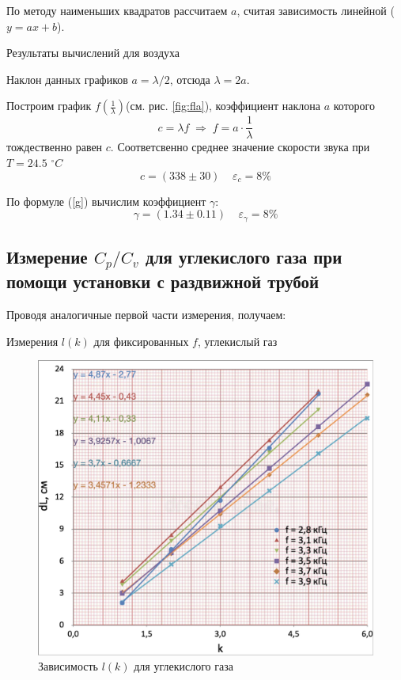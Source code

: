 \documentclass[12pt,a4paper]{article}
\begin{document}
По методу наименьших квадратов рассчитаем $a$, считая зависимость линейной ($y = ax + b$).

\begin{table}[h]
	\caption{Результаты вычислений для воздуха}
	
\end{table}

Наклон данных графиков $a = \lambda/2$, отсюда $\lambda = 2a$.


Построим график $f(\frac{1}{\lambda})$(см. рис. \ref{fig:fla}), коэффициент наклона $a$ которого 
	$$c = \lambda f \; \Rightarrow \; f=a\cdot\frac{1}{\lambda}$$
тождественно равен $c$.
Соответсвенно среднее значение скорости звука при $T = 24.5$ $^{\circ} C$
    $$c=(338 \pm 30) \;\;\;\; \varepsilon_{c}=8\%$$

По формуле (\ref{g}) вычислим коэффициент $\gamma$:
	$$\gamma=(1.34 \pm 0.11) \;\;\;\; \varepsilon_{\gamma}=8\%$$
	
\subsection*{Измерение $ C_p/C_v $ для углекислого газа при помощи установки с раздвижной трубой}

Проводя аналогичные первой части измерения, получаем:

\begin{table}[H]
	\caption{Измерения $l(k)$ для фиксированных $f$, углекислый газ}
	
\end{table}
		
\begin{figure}[H]
	\includegraphics[width = 10.5 cm]{src/l(k)co2.pdf}
	\caption{Зависимость $l(k)$ для углекислого газа}
	\label{fig:lkc}
\end{figure}
\end{document}
